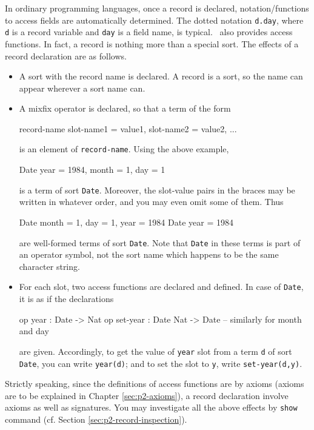 \documentclass[a4paper]{memoir}
\begin{document}
In ordinary programming languages, once a record is declared,
notation/functions to access fields are automatically determined.
The dotted notation \verb|d.day|, where \verb|d| is a record variable
and \verb|day| is a field name, is typical.
\cafeobj~also provides access functions. In fact, a record is nothing more
than a special sort. The effects of a record declaration are as follows.
\begin{itemize}
\item A sort with the record name is declared. A record is a sort,
  so the name can appear wherever a sort name can.
\item A mixfix operator is declared, so that a term of the form
  \begin{vvtm}
\begin{ccode}
     record-name { slot-name1 = value1, slot-name2 = value2, ... }
  \end{ccode}
\end{vvtm}
  is an element of \verb|record-name|.
  Using the above example,
  \begin{vvtm}
\begin{ccode}
     Date { year = 1984, month = 1, day = 1 }
  \end{ccode}
\end{vvtm}
  is a term of sort \verb|Date|. Moreover, the slot-value pairs
  in the braces may be written in whatever order, and you may even
  omit some of them. Thus
  \begin{vvtm}
\begin{ccode}
     Date { month = 1, day = 1, year = 1984 }
     Date { year = 1984 }
  \end{ccode}
\end{vvtm}
  are well-formed terms of sort \verb|Date|. Note that \verb|Date| in
  these terms is part of an operator symbol, not the sort name
  which happens to be the same character string.
\item For each slot, two access functions are declared and defined.
  In case of \verb|Date|, it is as if the declarations
  \begin{vvtm}
\begin{ccode}
     op year : Date -> Nat
     op set-year : Date Nat -> Date
     -- similarly for month and day
  \end{ccode}
\end{vvtm}
  are given. Accordingly, to get the value of \verb|year| slot
  from a term \verb|d| of sort \verb|Date|, you can write \verb|year(d)|;
  and to set the slot to \verb|y|, write \verb|set-year(d,y)|.
\end{itemize}
Strictly speaking, since the definitions of access functions are by
axioms (axioms are to be explained in Chapter \ref{sec:p2-axioms}), a
record declaration involve axioms as well as signatures.
You may investigate all the above effects by \verb|show| command
(cf. Section \ref{sec:p2-record-inspection}).
\end{document}
